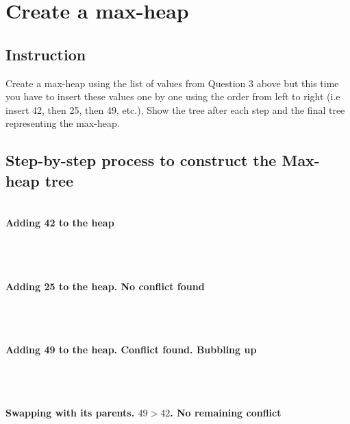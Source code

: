 \section{Create a max-heap}
\subsection{Instruction}
Create a max-heap using the list of values from Question 3 above but this time you have to insert
these values one by one using the order from left to right (i.e insert 42, then 25, then 49, etc.).
Show the tree after each step and the final tree representing the max-heap.

\subsection{Step-by-step process to construct the Max-heap tree}
\\
\textbf{Adding 42 to the heap}
\\
\\
\\
\\
\textbf{Adding 25 to the heap. No conflict found}
\\
\\

\\
\\
\textbf{Adding 49 to the heap. Conflict found. Bubbling up}
\\
\\

\\
\\
\textbf{Swapping with its parents. $49>42$. No remaining conflict}
\\
\\


